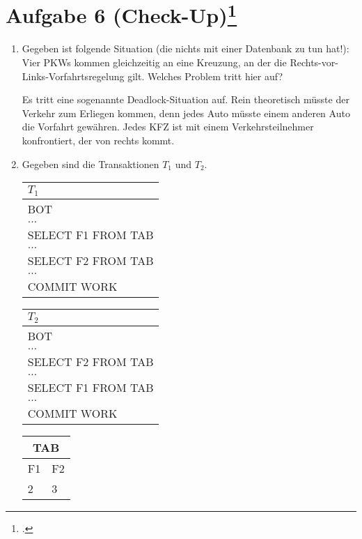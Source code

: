 \documentclass{lehramt-informatik-aufgabe}
\begin{document}

\section{
Aufgabe 6 (Check-Up)\footcite[Aufgabe 6]{db:ab:6}
}

\begin{enumerate}


\item Gegeben ist folgende Situation (die nichts mit einer Datenbank zu
tun hat!): Vier PKWs kommen gleichzeitig an eine Kreuzung, an der die
Rechts-vor-Links-Vorfahrtsregelung gilt. Welches Problem tritt hier auf?

\begin{liAntwort}
Es tritt eine sogenannte Deadlock-Situation auf. Rein
theoretisch müsste der Verkehr zum Erliegen kommen, denn jedes Auto
müsste einem anderen Auto die Vorfahrt gewähren. Jedes KFZ ist mit einem
Verkehrsteilnehmer konfrontiert, der von rechts kommt.
\end{liAntwort}


\item Gegeben sind die Transaktionen $T_1$ und $T_2$.

\begin{center}
\begin{tabular}{|l|}
\hline
$T_1$ \\\hline
BOT \\\hline
$\dots$ \\\hline
SELECT F1 FROM TAB \\\hline
$\dots$ \\\hline
SELECT F2 FROM TAB \\\hline
$\dots$ \\\hline
COMMIT WORK \\\hline
\end{tabular}
%
\begin{tabular}{|l|}
\hline
$T_2$ \\\hline
BOT \\\hline
$\dots$ \\\hline
SELECT F2 FROM TAB \\\hline
$\dots$ \\\hline
SELECT F1 FROM TAB \\\hline
$\dots$ \\\hline
COMMIT WORK \\\hline
\end{tabular}
%
\begin{tabular}{|l|l|}
\hline
\multicolumn{2}{|c|}{TAB} \\\hline
F1 & F2 \\\hline
2 & 3 \\\hline
\end{tabular}
\end{center}


\end{enumerate}
\end{document}
